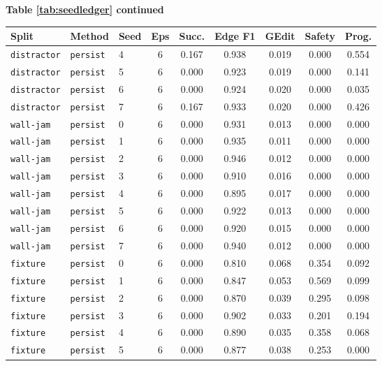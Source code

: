 \documentclass{article}
\begin{document}
\begin{center}
\textbf{Table \ref{tab:seedledger} continued}\\[0.4ex]
\begin{tabular}{lllcccccc}
\toprule
Split & Method & Seed & Eps & Succ. & Edge F1 & GEdit & Safety & Prog. \\
\midrule
\texttt{distractor} & \texttt{persist} & 4 & 6 & 0.167 & 0.938 & 0.019 & 0.000 & 0.554 \\
\texttt{distractor} & \texttt{persist} & 5 & 6 & 0.000 & 0.923 & 0.019 & 0.000 & 0.141 \\
\texttt{distractor} & \texttt{persist} & 6 & 6 & 0.000 & 0.924 & 0.020 & 0.000 & 0.035 \\
\texttt{distractor} & \texttt{persist} & 7 & 6 & 0.167 & 0.933 & 0.020 & 0.000 & 0.426 \\
\texttt{wall-jam} & \texttt{persist} & 0 & 6 & 0.000 & 0.931 & 0.013 & 0.000 & 0.000 \\
\texttt{wall-jam} & \texttt{persist} & 1 & 6 & 0.000 & 0.935 & 0.011 & 0.000 & 0.000 \\
\texttt{wall-jam} & \texttt{persist} & 2 & 6 & 0.000 & 0.946 & 0.012 & 0.000 & 0.000 \\
\texttt{wall-jam} & \texttt{persist} & 3 & 6 & 0.000 & 0.910 & 0.016 & 0.000 & 0.000 \\
\texttt{wall-jam} & \texttt{persist} & 4 & 6 & 0.000 & 0.895 & 0.017 & 0.000 & 0.000 \\
\texttt{wall-jam} & \texttt{persist} & 5 & 6 & 0.000 & 0.922 & 0.013 & 0.000 & 0.000 \\
\texttt{wall-jam} & \texttt{persist} & 6 & 6 & 0.000 & 0.920 & 0.015 & 0.000 & 0.000 \\
\texttt{wall-jam} & \texttt{persist} & 7 & 6 & 0.000 & 0.940 & 0.012 & 0.000 & 0.000 \\
\texttt{fixture} & \texttt{persist} & 0 & 6 & 0.000 & 0.810 & 0.068 & 0.354 & 0.092 \\
\texttt{fixture} & \texttt{persist} & 1 & 6 & 0.000 & 0.847 & 0.053 & 0.569 & 0.099 \\
\texttt{fixture} & \texttt{persist} & 2 & 6 & 0.000 & 0.870 & 0.039 & 0.295 & 0.098 \\
\texttt{fixture} & \texttt{persist} & 3 & 6 & 0.000 & 0.902 & 0.033 & 0.201 & 0.194 \\
\texttt{fixture} & \texttt{persist} & 4 & 6 & 0.000 & 0.890 & 0.035 & 0.358 & 0.068 \\
\texttt{fixture} & \texttt{persist} & 5 & 6 & 0.000 & 0.877 & 0.038 & 0.253 & 0.000 \\

\end{tabular}
\end{center}
\end{document}
